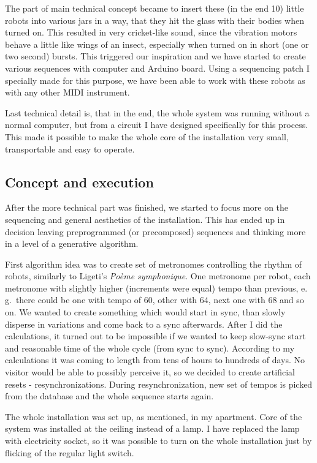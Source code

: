 \documentclass[11pt,a4paper,oneside]{report}
\begin{document}
The part of main technical concept became to insert these (in the end 10) little robots into various jars in a way, that they hit the glass with their bodies when turned on. This resulted in very cricket-like sound, since the vibration motors behave a little like wings of an insect, especially when turned on in short (one or two second) bursts. This triggered our inspiration and we have started to create various sequences with computer and Arduino board. Using a sequencing patch I specially made for this purpose, we have been able to work with these robots as with any other MIDI instrument.

Last technical detail is, that in the end, the whole system was running without a normal computer, but from a circuit I have designed specifically for this process. This made it possible to make the whole core of the installation very small, transportable and easy to operate.

\subsection{Concept and execution} After the more technical part was finished, we started to focus more on the sequencing and general aesthetics of the installation. This has ended up in decision leaving preprogrammed (or precomposed) sequences and thinking more in a level of a generative algorithm. 

First algorithm idea was to create set of metronomes controlling the rhythm of robots, similarly to Ligeti's \emph{Poème symphonique}. One metronome per robot, each metronome with slightly higher (increments were equal) tempo than previous, e. g.\ there could be one with tempo of 60, other with 64, next one with 68 and so on. We wanted to create something which would start in sync, than slowly disperse in variations and come back to a sync afterwards. After I did the calculations, it turned out to be impossible if we wanted to keep slow-sync start and reasonable time of the whole cycle (from sync to sync). According to my calculations it was coming to length from tens of hours to hundreds of days. No visitor would be able to possibly perceive it, so we decided to create artificial resets - resynchronizations. During resynchronization, new set of tempos is picked from the database and the whole sequence starts again.

The whole installation was set up, as mentioned, in my apartment. Core of the system was installed at the ceiling instead of a lamp. I have replaced the lamp with electricity socket, so it was possible to turn on the whole installation just by flicking of the regular light switch.
\end{document}
